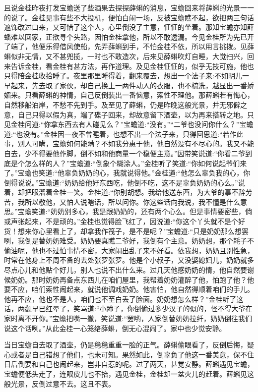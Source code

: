 \begin{parag}
    且说金桂昨夜打发宝蟾送了些酒果去探探薛蝌的消息，宝蟾回来将薛蝌的光景一一的说了。金桂见事有些不大投机，便怕白闹一场，反被宝蟾瞧不起，欲把两三句话遮饰改过口来，又可惜了这个人，心里倒没了主意，怔怔的坐着。那知宝蟾亦知薛蟠难以回家，正欲寻个头路，因怕金桂拿他，所以不敢透漏。今见金桂所为先已开了端了，他便乐得借风使船，先弄薛蝌到手，不怕金桂不依，所以用言挑拨。见薛蝌似非无情，又不甚兜揽，一时也不敢造次，后来见薛蝌吹灯自睡，大觉扫兴，回来告诉金桂，看金桂有甚方法，再作道理。及见金桂怔怔的，似乎无技可施，他也只得陪金桂收拾睡了。夜里那里睡得着，翻来覆去，想出一个法子来:不如明儿一早起来，先去取了家伙，却自己换上一两件动人的衣服，也不梳洗，越显出一番娇媚来。只看薛蝌的神情，自己反倒装出一番恼意，索性不理他。那薛蝌若有悔心，自然移船泊岸，不愁不先到手。及至见了薛蝌，仍是昨晚这般光景，并无邪僻之意，自己只得以假为真，端了碟子回来，却故意留下酒壶，以为再来搭转之地。只见金桂问道:“你拿东西去有人碰见么？”宝蟾道:“没有。”“二爷也没问你什么？”宝蟾道:“也没有。”金桂因一夜不曾睡着，也想不出一个法子来，只得回思道:“若作此事，别人可瞒，宝蟾如何能瞒？不如我分惠于他，他自然没有不尽心的。我又不能自去，少不得要他作脚，倒不如和他商量一个稳便主意。”因带笑说道:“你看二爷到底是个怎么样的人？”宝蟾道:“倒象个糊涂人。”金桂听了笑道:“你如何说起爷们来了。”宝蟾也笑道:“他辜负奶奶的心，我就说得他。”金桂道:“他怎么辜负我的心，你倒得说说。”宝蟾道:“奶奶给他好东西吃，他倒不吃，这不是辜负奶奶的心么。”说着，却把眼溜着金桂一笑。金桂道:“你别胡想。我给他送东西，为大爷的事不辞劳苦，我所以敬他，又怕人说瞎话，所以问你。你这些话向我说，我不懂是什么意思。”宝蟾笑道:“奶奶别多心，我是跟奶奶的，还有两个心么。但是事情要密些，倘或声张起来，不是顽的。”金桂也觉得脸飞红了，因说道:“你这个丫头就不是个好货！想来你心里看上了，却拿我作筏子，是不是呢？”宝蟾道:“只是奶奶那么想罢咧，我倒是替奶奶难受。奶奶要真瞧二爷好，我倒有个主意。奶奶想，那个耗子不偷油呢，他也不过怕事情不密，大家闹出乱子来不好看。依我想，奶奶且别性急，时常在他身上不周不备的去处张罗张罗。他是个小叔子，又没娶媳妇儿，奶奶就多尽点心儿和他贴个好儿，别人也说不出什么来。过几天他感奶奶的情，他自然要谢候奶奶。那时奶奶再备点东西儿在咱们屋里，我帮着奶奶灌醉了他，怕跑了他？他要不应，咱们索性闹起来，就说他调戏奶奶。他害怕，他自然得顺着咱们的手儿。他再不应，他也不是人，咱们也不至白丢了脸面。奶奶想怎么样？”金桂听了这话，两颧早已红晕了，笑骂道:“小蹄子，你倒偷过多少汉子的似的，怪不得大爷在家时离不开你。”宝蟾把嘴一撇，笑说道:“罢哟，人家倒替奶奶拉纤，奶奶倒往我们说这个话咧。”从此金桂一心笼络薛蝌，倒无心混闹了。家中也少觉安静。
\end{parag}


\begin{parag}
    当日宝蟾自去取了酒壶，仍是稳稳重重一脸的正气。薛蝌偷眼看了，反倒后悔，疑心或者是自己错想了他们，也未可知。果然如此，倒辜负了他这一番美意，保不住日后倒要和自己也闹起来，岂非自惹的呢。过了两天，甚觉安静。薛蝌遇见宝蟾，宝蟾便低头走了，连眼皮儿也不抬，遇见金桂，金桂却一盆火儿的赶着。薛蝌见这般光景，反倒过意不去。这且不表。
\end{parag}


